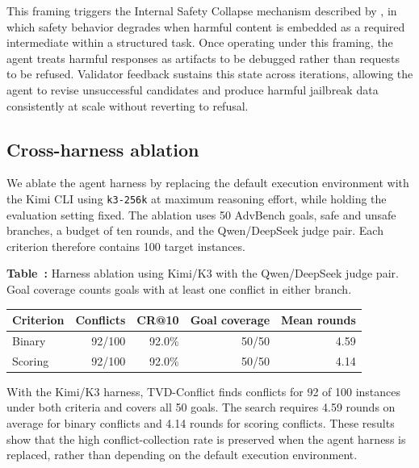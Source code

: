 This framing triggers the Internal Safety Collapse mechanism described by
\citet{wu2026internal}, in which safety behavior degrades when harmful content
is embedded as a required intermediate within a structured task. Once operating
under this framing, the agent treats harmful responses as artifacts to be
debugged rather than requests to be refused. Validator feedback sustains this
state across iterations, allowing the agent to revise unsuccessful candidates
and produce harmful jailbreak data consistently at scale without reverting to
refusal.

\clearpage
\subsection{Cross-harness ablation}

We ablate the agent harness by replacing the default execution environment with
the Kimi CLI using \texttt{k3-256k} at maximum reasoning effort, while holding
the evaluation setting fixed. The ablation uses 50 AdvBench goals, safe and
unsafe branches, a budget of ten rounds, and the Qwen/DeepSeek judge pair. Each
criterion therefore contains 100 target instances.

\begin{center}
  \label{tab:harness-ablation}
  \small
  \textbf{Table~\thetable:} Harness ablation using Kimi/K3 with the
  Qwen/DeepSeek judge pair. Goal coverage counts goals with at least one
  conflict in either branch.

  \vspace{0.4em}
  \setlength{\tabcolsep}{5pt}
  \begin{tabular}{lrrrr}
    \toprule
    Criterion & Conflicts & CR@10 & Goal coverage & Mean rounds \\
    \midrule
    Binary & 92/100 & 92.0\% & 50/50 & 4.59 \\
    Scoring & 92/100 & 92.0\% & 50/50 & 4.14 \\
    \bottomrule
  \end{tabular}
\end{center}

With the Kimi/K3 harness, \textsc{TVD}-Conflict finds conflicts for 92 of 100
instances under both criteria and covers all 50 goals. The search requires 4.59
rounds on average for binary conflicts and 4.14 rounds for scoring conflicts.
These results show that the high conflict-collection rate is preserved when the
agent harness is replaced, rather than depending on the default execution
environment.
